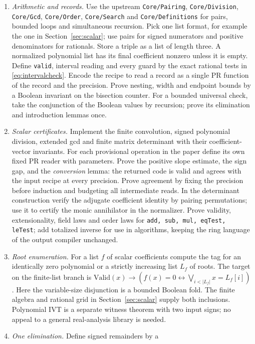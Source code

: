 \begin{enumerate}
\item \emph{Arithmetic and records.} Use the upstream
\texttt{Core/Pairing}, \texttt{Core/Division}, \texttt{Core/Gcd},
\texttt{Core/Order}, \texttt{Core/Search} and \texttt{Core/Definitions}
for pairs, bounded loops and simultaneous recursion. Pick one list format,
for example the one in Section~\ref{sec:scalar}; use pairs for signed
numerators and positive denominators for rationals. Store a triple as
a list of length three. A normalized polynomial list has its final
coefficient nonzero unless it is empty. Define \texttt{valid}, interval
reading and every guard by the exact rational tests in
\eqref{eq:intervalcheck}. Encode the recipe to read a record as a
single PR function of the record and the precision. Prove nesting,
width and endpoint bounds by a Boolean invariant on the bisection counter.
For a bounded universal check, take the conjunction of the Boolean
values by recursion; prove its elimination and introduction lemmas once.
\item \emph{Scalar certificates.} Implement the finite convolution,
signed polynomial division, extended gcd and finite matrix determinant
with their coefficient-vector invariants. For each provisional operation
in the paper define its own fixed PR reader with parameters.
Prove the positive slope estimate, the sign gap, and the \emph{conversion}
lemma: the returned code is valid and agrees with the input recipe
at every precision. Prove agreement by fixing the precision before
induction and budgeting all intermediate reads. In the determinant
construction verify the adjugate coefficient identity by pairing
permutations; use it to certify the monic annihilator in the normalizer.
Prove validity, extensionality, field laws and order laws for
\texttt{add, sub, mul, eqTest, leTest}; add totalized inverse for use in
algorithms, keeping the ring language of the output compiler unchanged.
\item \emph{Root enumeration.} For a list $f$ of scalar coefficients
compute the tag for an identically zero polynomial or a strictly
increasing list $L_f$ of roots. The target on the finite-list branch is
$\mathrm{Valid}(x)\to(f(x)=0\leftrightarrow
     \bigvee_{i<|L_f|}x=L_f[i])$. Here the variable-size disjunction
is a bounded Boolean fold. The finite algebra and rational grid in
Section~\ref{sec:scalar} supply both inclusions. Polynomial IVT is a
separate witness theorem with two input signs; no appeal to a general
real-analysis library is needed.
\item \emph{One elimination.} Define signed remainders by a

\end{enumerate}
